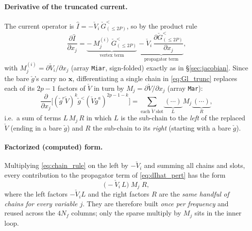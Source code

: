 \documentclass[11pt,a4paper]{article}
\begin{document}
\paragraph{Derivative of the truncated current.}
The current operator is $\hat I=-\check V_i\,\check G^<_{(\le2P)}$, so by the
product rule
\begin{equation}
  \frac{\partial \hat I}{\partial x_j}
  = \underbrace{-\,M^{(i)}_j\,\check G^<_{(\le2P)}}_{\text{vertex term}}
   \;\underbrace{-\;\check V_i\,\frac{\partial \check G^<_{(\le2P)}}{\partial x_j}}_{\text{propagator term}},
  \label{eq:dIhat_pert}
\end{equation}
with $M^{(i)}_j=\partial\check V_i/\partial x_j$ (array \texttt{Miar}, sign-folded)
exactly as in \S\ref{sec:jacobian}.  Since the bare $\check g$'s carry no
$\mathbf x$, differentiating a single chain in \eqref{eq:Gl_trunc} replaces each
of its $2p-1$ factors of $\check V$ in turn by $M_j=\partial\check V/\partial x_j$
(array \texttt{Mar}):
\begin{equation}
  \frac{\partial}{\partial x_j}\Big[(\check g^r\check V)^{k}\check g^<(\check V\check g^a)^{2p-1-k}\Big]
  = \sum_{\text{each }\check V\text{ slot}} \underbrace{(\cdots)}_{L}\,M_j\,\underbrace{(\cdots)}_{R},
  \label{eq:chain_rule}
\end{equation}
i.e.\ a sum of terms $L\,M_j\,R$ in which $L$ is the sub-chain to the \emph{left}
of the replaced $\check V$ (ending in a bare $\check g$) and $R$ the sub-chain to
its \emph{right} (starting with a bare $\check g$).

\paragraph{Factorized (computed) form.}
Multiplying \eqref{eq:chain_rule} on the left by $-\check V_i$ and summing all
chains and slots, every contribution to the propagator term of
\eqref{eq:dIhat_pert} has the form
\begin{equation}
  \big(-\check V_i\,L\big)\;M_j\;R,
  \label{eq:LMR}
\end{equation}
where the left factors $-\check V_i L$ and the right factors $R$ are the
\emph{same handful of chains for every variable $j$}.  They are therefore built
\emph{once per frequency} and reused across the $4N_f$ columns; only the sparse
multiply by $M_j$ sits in the inner loop.
\end{document}
